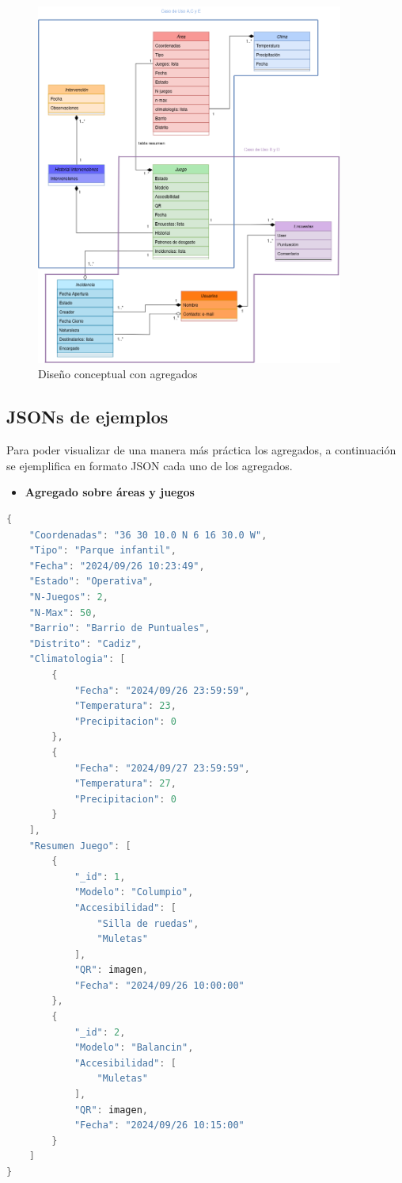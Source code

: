 \documentclass[]{article}
\begin{document}
\begin{figure}[H]
    \centering
    \includegraphics[width=0.9\textwidth]{diagrama_arqui.png}
    \caption{\small Diseño conceptual con agregados}
\end{figure}


\subsection{JSONs de ejemplos}
\label{sub_sec:json_ejemplos}
Para poder visualizar de una manera más práctica los agregados, a continuación se ejemplifica en formato JSON cada uno de los agregados. 
\begin{itemize}
    \item \textbf{Agregado sobre áreas y juegos}
\end{itemize}
\begin{lstlisting}[caption=Ejemplo de JSON para Agregado sobre Áreas y Juegos, language=C]
{
    "Coordenadas": "36 30 10.0 N 6 16 30.0 W",
    "Tipo": "Parque infantil",
    "Fecha": "2024/09/26 10:23:49",
    "Estado": "Operativa",
    "N-Juegos": 2,
    "N-Max": 50,
    "Barrio": "Barrio de Puntuales",
    "Distrito": "Cadiz",
    "Climatologia": [
        {
            "Fecha": "2024/09/26 23:59:59",
            "Temperatura": 23,
            "Precipitacion": 0
        },
        {
            "Fecha": "2024/09/27 23:59:59",
            "Temperatura": 27,
            "Precipitacion": 0
        }
    ],
    "Resumen Juego": [
        {
            "_id": 1,
            "Modelo": "Columpio",
            "Accesibilidad": [
                "Silla de ruedas",
                "Muletas"
            ],
            "QR": imagen,
            "Fecha": "2024/09/26 10:00:00"
        },
        {
            "_id": 2,
            "Modelo": "Balancin",
            "Accesibilidad": [
                "Muletas"
            ],
            "QR": imagen,
            "Fecha": "2024/09/26 10:15:00"
        }
    ]
}
\end{lstlisting}
\end{document}
